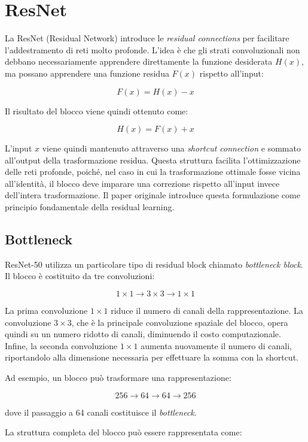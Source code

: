 \section{ResNet}

La ResNet (Residual Network) introduce le \textit{residual connections} per facilitare
l'addestramento di reti molto profonde. L'idea è che gli strati convoluzionali non
debbano necessariamente apprendere direttamente la funzione desiderata $H(x)$, ma
possano apprendere una funzione residua $F(x)$ rispetto all'input:

\[
F(x) = H(x) - x
\]

Il risultato del blocco viene quindi ottenuto come:

\[
H(x) = F(x) + x
\]

L'input $x$ viene quindi mantenuto attraverso una \textit{shortcut connection} e
sommato all'output della trasformazione residua. Questa struttura facilita
l'ottimizzazione delle reti profonde, poiché, nel caso in cui la trasformazione
ottimale fosse vicina all'identità, il blocco deve imparare una correzione rispetto
all'input invece dell'intera trasformazione. Il paper originale introduce questa
formulazione come principio fondamentale della residual learning. 

\subsection{Bottleneck}

ResNet-50 utilizza un particolare tipo di residual block chiamato
\textit{bottleneck block}. Il blocco è costituito da tre convoluzioni:

\[
1\times1 \rightarrow 3\times3 \rightarrow 1\times1
\]

La prima convoluzione $1\times1$ riduce il numero di canali della rappresentazione.
La convoluzione $3\times3$, che è la principale convoluzione spaziale del blocco,
opera quindi su un numero ridotto di canali, diminuendo il costo computazionale.
Infine, la seconda convoluzione $1\times1$ aumenta nuovamente il numero di canali,
riportandolo alla dimensione necessaria per effettuare la somma con la shortcut.

Ad esempio, un blocco può trasformare una rappresentazione:

\[
256 \rightarrow 64 \rightarrow 64 \rightarrow 256
\]

dove il passaggio a 64 canali costituisce il \textit{bottleneck}.

La struttura completa del blocco può essere rappresentata come:

